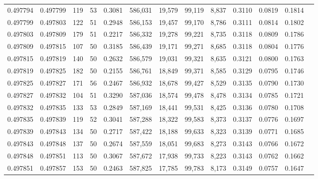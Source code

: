 \begin{tabular}{rrrrrrrrrrrrr}
0.497794 & 0.497799 &   119 &  53 &                                     0.3081 & 586,031 &  19,579 &  99,119 &   8,837 & 0.3110 & 0.0819 & 0.1814 \\
0.497799 & 0.497803 &   122 &  51 &                                     0.2948 & 586,153 &  19,457 &  99,170 &   8,786 & 0.3111 & 0.0814 & 0.1802 \\
0.497803 & 0.497809 &   179 &  51 &                                     0.2217 & 586,332 &  19,278 &  99,221 &   8,735 & 0.3118 & 0.0809 & 0.1786 \\
0.497809 & 0.497815 &   107 &  50 &                                     0.3185 & 586,439 &  19,171 &  99,271 &   8,685 & 0.3118 & 0.0804 & 0.1776 \\
0.497815 & 0.497819 &   140 &  50 &                                     0.2632 & 586,579 &  19,031 &  99,321 &   8,635 & 0.3121 & 0.0800 & 0.1763 \\
0.497819 & 0.497825 &   182 &  50 &                                     0.2155 & 586,761 &  18,849 &  99,371 &   8,585 & 0.3129 & 0.0795 & 0.1746 \\
0.497825 & 0.497827 &   171 &  56 &                                     0.2467 & 586,932 &  18,678 &  99,427 &   8,529 & 0.3135 & 0.0790 & 0.1730 \\
0.497827 & 0.497832 &   104 &  51 &                                     0.3290 & 587,036 &  18,574 &  99,478 &   8,478 & 0.3134 & 0.0785 & 0.1721 \\
0.497832 & 0.497835 &   133 &  53 &                                     0.2849 & 587,169 &  18,441 &  99,531 &   8,425 & 0.3136 & 0.0780 & 0.1708 \\
0.497835 & 0.497839 &   119 &  52 &                                     0.3041 & 587,288 &  18,322 &  99,583 &   8,373 & 0.3137 & 0.0776 & 0.1697 \\
0.497839 & 0.497843 &   134 &  50 &                                     0.2717 & 587,422 &  18,188 &  99,633 &   8,323 & 0.3139 & 0.0771 & 0.1685 \\
0.497843 & 0.497848 &   137 &  50 &                                     0.2674 & 587,559 &  18,051 &  99,683 &   8,273 & 0.3143 & 0.0766 & 0.1672 \\
0.497848 & 0.497851 &   113 &  50 &                                     0.3067 & 587,672 &  17,938 &  99,733 &   8,223 & 0.3143 & 0.0762 & 0.1662 \\
0.497851 & 0.497857 &   153 &  50 &                                     0.2463 & 587,825 &  17,785 &  99,783 &   8,173 & 0.3149 & 0.0757 & 0.1647 \\

\end{tabular}

